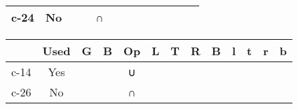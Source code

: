 \begin{tabular}[pos]{ | r | c | c | c | c | c | c | c | c | c | c | c | c | }
{\mktsStyleBold{}c-24} & No & \cjkgGlue{\cjk{}\cjkgGlue{\cnjzr{}}\cjkgGlue{}}\cjkgGlue{} & \cjkgGlue{\cjk{}\cjkgGlue{\cnjzr{}}\cjkgGlue{}}\cjkgGlue{} & {\mktsRsgFb{}∩} & \cjkgGlue{\cjk{}\cjkgGlue{\cnjzr{}}\cjkgGlue{}}\cjkgGlue{} &  & \cjkgGlue{\cjk{}\cjkgGlue{\cnjzr{}}\cjkgGlue{}}\cjkgGlue{} & \cjkgGlue{\cjk{}\cjkgGlue{\cnjzr{}}\cjkgGlue{}}\cjkgGlue{} &  &  &  & \\
\hline
\end{tabular}



\begin{tabular}[pos]{ | r | c | c | c | c | c | c | c | c | c | c | c | c | }
\hline
 & {\mktsStyleBold{}Used} & {\mktsStyleBold{}G} & {\mktsStyleBold{}B} & {\mktsStyleBold{}Op} & {\mktsStyleBold{}L} & {\mktsStyleBold{}T} & {\mktsStyleBold{}R} & {\mktsStyleBold{}B} & {\mktsStyleBold{}l} & {\mktsStyleBold{}t} & {\mktsStyleBold{}r} & {\mktsStyleBold{}b}\\

\hline
{\mktsStyleBold{}c-14} & Yes & \cjkgGlue{\cjk{}\cjkgGlue{\cnjzr{}}\cjkgGlue{}}\cjkgGlue{} & \cjkgGlue{\cjk{}\cjkgGlue{\cnjzr{}}\cjkgGlue{}}\cjkgGlue{} & {\mktsRsgFb{}∪} & \cjkgGlue{\cjk{}\cjkgGlue{\cnjzr{}}\cjkgGlue{}}\cjkgGlue{} & \cjkgGlue{\cjk{}\cjkgGlue{\cnjzr{}}\cjkgGlue{}}\cjkgGlue{} & \cjkgGlue{\cjk{}\cjkgGlue{\cnjzr{}}\cjkgGlue{}}\cjkgGlue{} & \cjkgGlue{\cjk{}\cjkgGlue{\cnjzr{}}\cjkgGlue{}}\cjkgGlue{} &  &  &  & \\
{\mktsStyleBold{}c-26} & No & \cjkgGlue{\cjk{}\cjkgGlue{\cnjzr{}}\cjkgGlue{}}\cjkgGlue{} & \cjkgGlue{\cjk{}\cjkgGlue{\cnjzr{}}\cjkgGlue{}}\cjkgGlue{} & {\mktsRsgFb{}∩} & \cjkgGlue{\cjk{}\cjkgGlue{\cnjzr{}}\cjkgGlue{}}\cjkgGlue{} & \cjkgGlue{\cjk{}\cjkgGlue{\cnjzr{}}\cjkgGlue{}}\cjkgGlue{} & \cjkgGlue{\cjk{}\cjkgGlue{\cnjzr{}}\cjkgGlue{}}\cjkgGlue{} & \cjkgGlue{\cjk{}\cjkgGlue{\cnjzr{}}\cjkgGlue{}}\cjkgGlue{} &  &  &  & \\
\hline
\end{tabular}



\vspace{\myLineheight}\begin{multicols}{2}\raggedcolumns{}\end{multicols}



